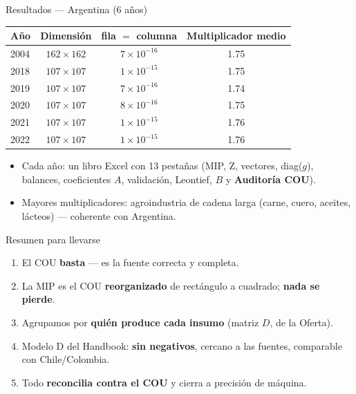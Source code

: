 \documentclass[aspectratio=169,10pt]{beamer}
\begin{document}
\begin{frame}{Resultados — Argentina (6 años)}
  \begin{center}
  \begin{tabular}{lccc}
    \toprule
    Año & Dimensión & fila $=$ columna & Multiplicador medio \\
    \midrule
    2004 & $162\times162$ & $7\times10^{-16}$ & 1.75 \\
    2018 & $107\times107$ & $1\times10^{-15}$ & 1.75 \\
    2019 & $107\times107$ & $7\times10^{-16}$ & 1.74 \\
    2020 & $107\times107$ & $8\times10^{-16}$ & 1.75 \\
    2021 & $107\times107$ & $1\times10^{-15}$ & 1.76 \\
    2022 & $107\times107$ & $1\times10^{-15}$ & 1.76 \\
    \bottomrule
  \end{tabular}
  \end{center}
  \begin{itemize}
    \item Cada año: un libro Excel con 13 pestañas (MIP, Z, vectores, diag($g$), balances, coeficientes $A$, validación, Leontief, $B$ y \textbf{Auditoría COU}).
    \item Mayores multiplicadores: agroindustria de cadena larga (carne, cuero, aceites, lácteos) — coherente con Argentina.
  \end{itemize}
\end{frame}

\begin{frame}{Resumen para llevarse}
  \begin{enumerate}
    \item El COU \textbf{basta} — es la fuente correcta y completa.
    \item La MIP es el COU \textbf{reorganizado} de rectángulo a cuadrado; \textbf{nada se pierde}.
    \item Agrupamos por \textbf{quién produce cada insumo} (matriz $D$, de la Oferta).
    \item Modelo D del Handbook: \textbf{sin negativos}, cercano a las fuentes, comparable con Chile/Colombia.
    \item Todo \textbf{reconcilia contra el COU} y cierra a precisión de máquina.
  \end{enumerate}
\end{frame}
\end{document}
